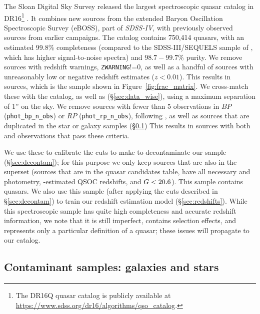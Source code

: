 The Sloan Digital Sky Survey released the largest spectroscopic quasar catalog in DR16\footnote{The \SDSS DR16Q quasar catalog is publicly available at \url{https://www.sdss.org/dr16/algorithms/qso_catalog}.} \citep{lyke_sloan_2020}.
It combines new sources from the extended Baryon Oscillation Spectroscopic Survey (eBOSS), part of \textsl{SDSS-IV}, with previously observed sources from earlier \SDSS campaigns.
The catalog contains 750,414 quasars, with an estimated 99.8\% completeness (compared to the SDSS-III/SEQUELS sample of \citealt{myers_sdss-iv_2015}, which has higher signal-to-noise spectra) and $98.7-99.7$\% purity.
We remove sources with redshift warnings, \texttt{ZWARNING}!=0, as well as a handful of sources with unreasonably low or negative redshift estimates ($z<0.01$). 
This results in  sources, which is the sample shown in Figure~\ref{fig:frac_matrix}.
We cross-match these with the \Gaia catalog, as well as \unWISE (\S\ref{sec:data_wise}), using a maximum separation of 1'' on the sky.
We remove sources with fewer than 5 observations in $BP$ (\texttt{phot\_bp\_n\_obs}) or $RP$ (\texttt{phot\_rp\_n\_obs}), following \citep{bailer-jones_dsc_2021}, as well as sources that are duplicated in the \SDSS star or galaxy samples (\S\ref{sec:data_contaminants}) 
This results in  sources with both \Gaia and \unWISE observations that pass these criteria.

We use these to calibrate the cuts to make to decontaminate our sample (\S\ref{sec:decontam}); for this purpose we only keep sources that are also in the \cat superset (sources that are in the \Gaia quasar candidates table, have all necessary \Gaia and \unWISE photometry, \Gaia-estimated QSOC redshifts, and $G < 20.6$).
This sample contains  quasars.
We also use this sample (after applying the cuts described in \S\ref{sec:decontam}) to train our redshift estimation model (\S\ref{sec:redshifts}).
While this spectroscopic sample has quite high completeness and accurate redshift information, we note that it is still imperfect, contains selection effects, and represents only a particular definition of a quasar; these issues will propagate to our catalog.


\subsection{Contaminant samples: galaxies and stars}
\label{sec:data_contaminants}

